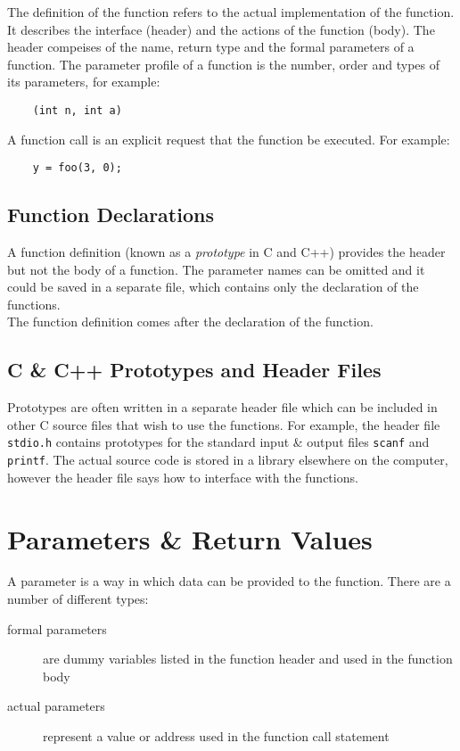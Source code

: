 The definition of the function refers to the actual implementation of the function. It describes the interface (header) and the actions of the function (body). The header compeises of the name, return type and the formal parameters of a function. The parameter profile of a function is the number, order and types of its parameters, for example:
\begin{verbatim}
    (int n, int a)
\end{verbatim}

A function call is an explicit request that the function be executed. For example:
\begin{verbatim}
    y = foo(3, 0);
\end{verbatim}

\subsection{Function Declarations}
A function definition (known as a \textit{prototype} in C and C++) provides the header but not the body of a function. The parameter names can be omitted and it could be saved in a separate file, which contains only the declaration of the functions.\\

The function definition comes after the declaration of the function. 

\subsection{C \& C++ Prototypes and Header Files}
Prototypes are often written in a separate header file which can be included in other C source files that wish to use the functions. For example, the header file \verb|stdio.h| contains prototypes for the standard input \& output files \verb|scanf| and \verb|printf|. The actual source code is stored in a library elsewhere on the computer, however the header file says how to interface with the functions.

\section*{Parameters \& Return Values}
A parameter is a way in which data can be provided to the function. There are a number of different types:
\begin{description}
    \item[formal parameters] are dummy variables listed in the function header and used in the function body
    \item[actual parameters] represent a value or address used in the function call statement 
\end{description}


